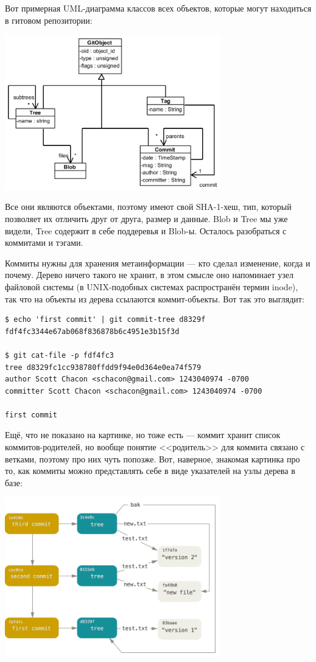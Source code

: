 \documentclass[a5paper]{article}
\begin{document}
Вот примерная UML-диаграмма классов всех объектов, которые могут находиться в гитовом репозитории:
\begin{center}
    \includegraphics[width=0.7\textwidth]{gitDataStructure.png}
\end{center}

Все они являются объектами, поэтому имеют свой SHA-1-хеш, тип, который позволяет их отличить друг от друга, размер и данные. Blob и Tree мы уже видели, Tree содержит в себе поддеревья и Blob-ы. Осталось разобраться с коммитами и тэгами. 

Коммиты нужны для хранения метаинформации --- кто сделал изменение, когда и почему. Дерево ничего такого не хранит, в этом смысле оно напоминает узел файловой системы (в UNIX-подобных системах распространён термин inode), так что на объекты из дерева ссылаются коммит-объекты. Вот так это выглядит:
\begin{verbatim}
$ echo 'first commit' | git commit-tree d8329f
fdf4fc3344e67ab068f836878b6c4951e3b15f3d

$ git cat-file -p fdf4fc3
tree d8329fc1cc938780ffdd9f94e0d364e0ea74f579
author Scott Chacon <schacon@gmail.com> 1243040974 -0700
committer Scott Chacon <schacon@gmail.com> 1243040974 -0700

first commit
\end{verbatim}

Ещё, что не показано на картинке, но тоже есть --- коммит хранит список коммитов-родителей, но вообще понятие <<родитель>> для коммита связано с ветками, поэтому про них чуть попозже. Вот, наверное, знакомая картинка про то, как коммиты можно представлять себе в виде указателей на узлы дерева в базе:

\begin{center}
    \includegraphics[width=0.7\textwidth]{gitCommitObjects.png}
\end{center}
\end{document}
